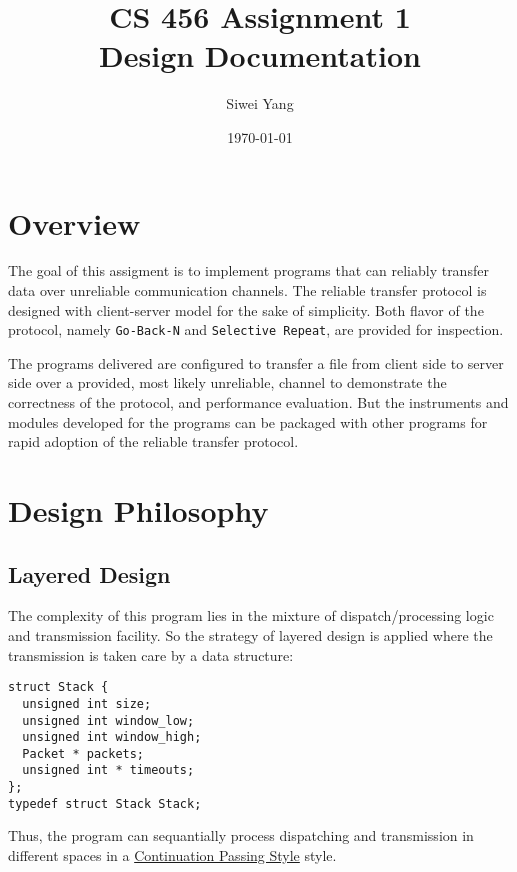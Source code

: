 \documentclass[12pt]{article}
\begin{document}
\title{CS 456 Assignment 1\\Design Documentation}
\date{\today}
\author{Siwei Yang}
\maketitle

\section{Overview}
The goal of this assigment is to implement programs that can reliably transfer data over unreliable communication channels. The reliable transfer protocol is designed with client-server model for the sake of simplicity. Both flavor of the protocol, namely \texttt{Go-Back-N} and \texttt{Selective Repeat}, are provided for inspection.

The programs delivered are configured to transfer a file from client side to server side over a provided, most likely unreliable, channel to demonstrate the correctness of the protocol, and performance evaluation. But the instruments and modules developed for the programs can be packaged with other programs for rapid adoption of the reliable transfer protocol.

\section{Design Philosophy}
\subsection{Layered Design}
The complexity of this program lies in the mixture of dispatch/processing logic and transmission facility. So the strategy of layered design is applied where the transmission is taken care by a data structure:
\begin{samepage}
\begin{verbatim}
struct Stack {
  unsigned int size;
  unsigned int window_low;
  unsigned int window_high;
  Packet * packets;
  unsigned int * timeouts;
};
typedef struct Stack Stack;
\end{verbatim}
\end{samepage}
Thus, the program can sequantially process dispatching and transmission in different spaces in a \href{http://en.wikipedia.org/wiki/Continuation-passing_style}{Continuation Passing Style} style.
\end{document}
